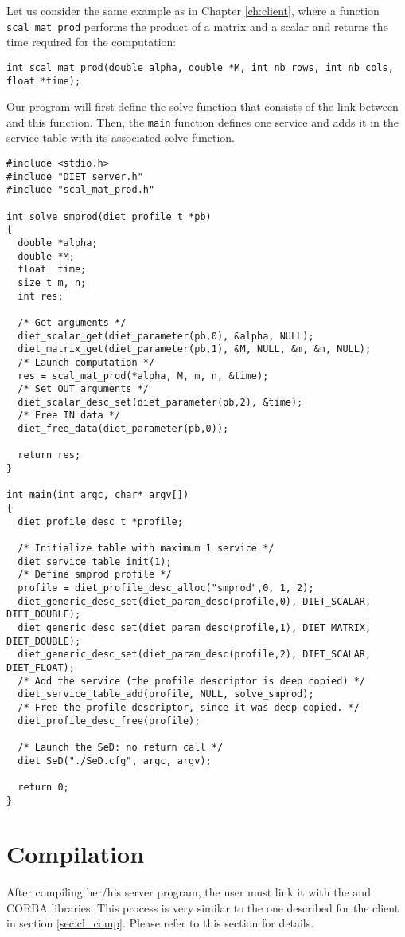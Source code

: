 Let us consider the same example as in Chapter \ref{ch:client}, where
a function \texttt{scal\_mat\_prod} performs the product of a matrix
and a scalar and returns the time required for the computation: {\footnotesize
\begin{verbatim}
int scal_mat_prod(double alpha, double *M, int nb_rows, int nb_cols, float *time);
\end{verbatim}
}
Our program will first define the solve function that consists of the link
between \diet and this function. Then, the \texttt{main} function defines one service and
adds it in the service table with its associated solve function.
{\footnotesize
\begin{verbatim}
#include <stdio.h>
#include "DIET_server.h"
#include "scal_mat_prod.h"

int solve_smprod(diet_profile_t *pb)
{
  double *alpha;
  double *M;
  float  time;
  size_t m, n;
  int res;

  /* Get arguments */
  diet_scalar_get(diet_parameter(pb,0), &alpha, NULL);
  diet_matrix_get(diet_parameter(pb,1), &M, NULL, &m, &n, NULL);
  /* Launch computation */
  res = scal_mat_prod(*alpha, M, m, n, &time);
  /* Set OUT arguments */
  diet_scalar_desc_set(diet_parameter(pb,2), &time);
  /* Free IN data */
  diet_free_data(diet_parameter(pb,0));

  return res;
}

int main(int argc, char* argv[])
{
  diet_profile_desc_t *profile;
  
  /* Initialize table with maximum 1 service */
  diet_service_table_init(1);
  /* Define smprod profile */
  profile = diet_profile_desc_alloc("smprod",0, 1, 2);
  diet_generic_desc_set(diet_param_desc(profile,0), DIET_SCALAR, DIET_DOUBLE);
  diet_generic_desc_set(diet_param_desc(profile,1), DIET_MATRIX, DIET_DOUBLE);
  diet_generic_desc_set(diet_param_desc(profile,2), DIET_SCALAR, DIET_FLOAT);
  /* Add the service (the profile descriptor is deep copied) */
  diet_service_table_add(profile, NULL, solve_smprod);
  /* Free the profile descriptor, since it was deep copied. */
  diet_profile_desc_free(profile);

  /* Launch the SeD: no return call */
  diet_SeD("./SeD.cfg", argc, argv);

  return 0;
}
\end{verbatim}
}

\section{Compilation}
\label{sec:sv_comp}

After compiling her/his server program, the user must link it with the \diet
and CORBA libraries. This process is very similar to the one described
for the client in section \ref{sec:cl_comp}. Please refer to this section
for details.

